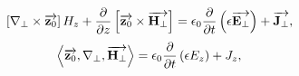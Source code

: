 %
%
\begin{equation} \label{eq:rotHt} 
\left[ \nabla_\perp \times \overrightarrow{\mathbf z_0} \right] H_z +
\frac{\partial }{\partial z} \left[ \overrightarrow{\mathbf z_0} \times \overrightarrow{\mathbf H_\perp} \right] =
\epsilon_0 \frac{\partial }{\partial t} \left( \epsilon  \overrightarrow{\mathbf E_\perp} \right) + 
\overrightarrow{\mathbf J_\perp},
\end{equation}
%
%
\begin{equation} \label{eq:rotHz}
\left< \overrightarrow{\mathbf z_0} , \nabla_\perp , \overrightarrow{\mathbf H_\perp} \right> = 
\epsilon_0 \frac{\partial }{\partial t} \left( \epsilon  E_z \right) + J_z,
\end{equation}
%
